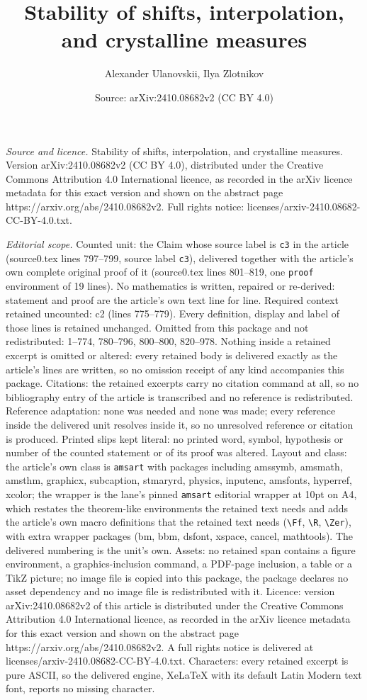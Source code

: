 \documentclass[10pt,a4paper]{amsart}
\title[Stability of shifts, interpolation, and crystalline measures]{Stability of shifts, interpolation, and crystalline measures}
\author{Alexander Ulanovskii, Ilya Zlotnikov}
\date{Source: arXiv:2410.08682v2 (CC BY 4.0)}
\begin{document}
\maketitle

\noindent\emph{Source and licence.} Stability of shifts, interpolation, and crystalline measures. Version arXiv:2410.08682v2 (CC BY 4.0), distributed under the Creative Commons Attribution 4.0 International licence, as recorded in the arXiv licence metadata for this exact version and shown on the abstract page https://arxiv.org/abs/2410.08682v2. Full rights notice: licenses/arxiv-2410.08682-CC-BY-4.0.txt.\par\smallskip

\noindent\textit{Editorial scope.} Counted unit: the Claim whose source label is \texttt{c3} in the article (source0.tex lines 797--799, source label \texttt{c3}), delivered together with the article's own complete original proof of it (source0.tex lines 801--819, one \texttt{proof} environment of 19 lines). No mathematics is written, repaired or re-derived: statement and proof are the article's own text line for line. Required context retained uncounted: c2 (lines 775--779). Every definition, display and label of those lines is retained unchanged. Omitted from this package and not redistributed: 1--774, 780--796, 800--800, 820--978. Nothing inside a retained excerpt is omitted or altered: every retained body is delivered exactly as the article's lines are written, so no omission receipt of any kind accompanies this package. Citations: the retained excerpts carry no citation command at all, so no bibliography entry of the article is transcribed and no reference is redistributed. Reference adaptation: none was needed and none was made; every reference inside the delivered unit resolves inside it, so no unresolved reference or citation is produced. Printed slips kept literal: no printed word, symbol, hypothesis or number of the counted statement or of its proof was altered. Layout and class: the article's own class is \texttt{amsart} with packages including amssymb, amsmath, amsthm, graphicx, subcaption, stmaryrd, physics, inputenc, amsfonts, hyperref, xcolor; the wrapper is the lane's pinned \texttt{amsart} editorial wrapper at 10pt on A4, which restates the theorem-like environments the retained text needs and adds the article's own macro definitions that the retained text needs (\texttt{\textbackslash Ff}, \texttt{\textbackslash R}, \texttt{\textbackslash Zer}), with extra wrapper packages (bm, bbm, dsfont, xspace, cancel, mathtools). The delivered numbering is the unit's own. Assets: no retained span contains a figure environment, a graphics-inclusion command, a PDF-page inclusion, a table or a TikZ picture; no image file is copied into this package, the package declares no asset dependency and no image file is redistributed with it. Licence: version arXiv:2410.08682v2 of this article is distributed under the Creative Commons Attribution 4.0 International licence, as recorded in the arXiv licence metadata for this exact version and shown on the abstract page https://arxiv.org/abs/2410.08682v2. A full rights notice is delivered at licenses/arxiv-2410.08682-CC-BY-4.0.txt. Characters: every retained excerpt is pure ASCII, so the delivered engine, XeLaTeX with its default Latin Modern text font, reports no missing character.
\end{document}
